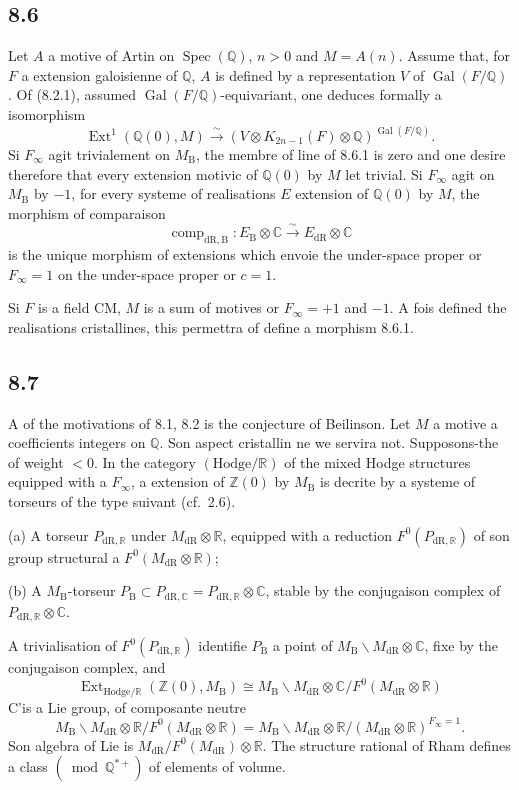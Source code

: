 \documentclass[12pt,a4paper]{article}
\theoremstyle{plain}
\theoremstyle{definition}
\theoremstyle{remark}
\DeclareMathOperator{\Spec}{Spec}
\DeclareMathOperator{\Gal}{Gal}
\DeclareMathOperator{\Ext}{Ext}
\DeclareMathOperator{\comp}{comp}
\newcommand{\DR}{\mathrm{dR}}
\newcommand{\B}{\mathrm{B}}
\newcommand{\Z}{\mathbb{Z}}
\newcommand{\Q}{\mathbb{Q}}
\newcommand{\C}{\mathbb{C}}
\newcommand{\R}{\mathbb{R}}
\begin{document}
\subsection*{8.6}
Let $A$ a motive of Artin on $\Spec(\Q)$, $n > 0$ and $M = A(n)$. Assume that, for $F$ a extension galoisienne of $\Q$, $A$ is defined by a representation $V$ of $\Gal(F/\Q)$. Of (8.2.1), assumed $\Gal(F/\Q)$-equivariant, one deduces formally a isomorphism
\begin{equation*}\tag{8.6.1}
\Ext^1(\Q(0), M) \xrightarrow{\sim} (V \otimes K_{2n-1}(F) \otimes \Q)^{\Gal(F/\Q)}.
\end{equation*}
Si $F_\infty$ agit trivialement on $M_\B$, the membre of line of 8.6.1 is zero and one desire therefore that every extension motivic of $\Q(0)$ by $M$ let trivial. Si $F_\infty$ agit on $M_\B$ by $-1$, for every systeme of realisations $E$ extension of $\Q(0)$ by $M$, the morphism of comparaison
\[
\comp_{\DR,\B}: E_\B \otimes \C \xrightarrow{\sim} E_\DR \otimes \C
\]
is the unique morphism of extensions which envoie the under-space proper or $F_\infty = 1$ on the under-space proper or $c = 1$.

Si $F$ is a field CM, $M$ is a sum of motives or $F_\infty = +1$ and $-1$. A fois defined the realisations cristallines, this permettra of define a morphism 8.6.1.

\subsection*{8.7}
A of the motivations of 8.1, 8.2 is the conjecture of Beilinson. Let $M$ a motive a coefficients integers on $\Q$. Son aspect cristallin ne we servira not. Supposons-the of weight $< 0$. In the category $(\mathrm{Hodge}/\R)$ of the mixed Hodge structures equipped with a $F_\infty$, a extension of $\Z(0)$ by $M_\B$ is decrite by a systeme of torseurs of the type suivant (cf.~2.6).

(a) A torseur $P_{\DR,\R}$ under $M_\DR \otimes \R$, equipped with a reduction $F^0(P_{\DR,\R})$ of son group structural a $F^0(M_\DR \otimes \R)$;

(b) A $M_\B$-torseur $P_\B \subset P_{\DR,\C} = P_{\DR,\R} \otimes \C$, stable by the conjugaison complex of $P_{\DR,\R} \otimes \C$.

A trivialisation of $F^0(P_{\DR,\R})$ identifie $P_\B$ a point of $M_\B \backslash M_\DR \otimes \C$, fixe by the conjugaison complex, and
\[
\Ext_{\mathrm{Hodge}/\R}(\Z(0), M_\B) \cong M_\B \backslash M_\DR \otimes \C / F^0(M_\DR \otimes \R)
\]
C'is a Lie group, of composante neutre
\[
M_\B \backslash M_\DR \otimes \R / F^0(M_\DR \otimes \R) = M_\B \backslash M_\DR \otimes \R / (M_\DR \otimes \R)^{F_\infty = 1}.
\]
Son algebra of Lie is $M_\DR / F^0(M_\DR) \otimes \R$. The structure rational of Rham defines a class $(\bmod \Q^{*+})$ of elements of volume.
\end{document}
